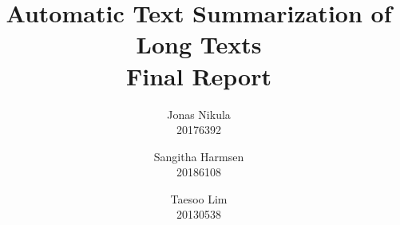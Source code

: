 \documentclass{article}
\title{Automatic Text Summarization of Long Texts \\ Final Report} %
\author{Jonas Nikula \\ 20176392
\and Sangitha Harmsen \\ 20186108
\and Taesoo Lim \\ 20130538} %
\date{} %
\begin{document}
\sloppy

\maketitle %

\begin{abstract}

\end{abstract}

\tableofcontents
\twocolumn





\printbibliography{}

\onecolumn

\end{document}
